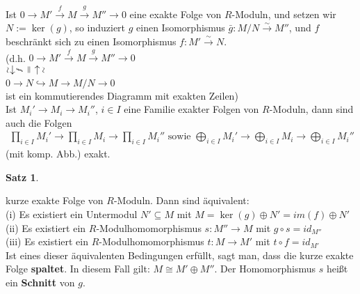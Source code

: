 \documentclass[10pt,a4paper,numbers=endperiod]{scrreprt}
\theoremstyle{definition}
\newtheorem{satz}{Satz}[section]
\newcommand{\verteq}{\rotatebox{90}{$\,=$}}
\newcommand{\vertri}{\rotatebox{90}{$\underset{f}{\overset{\sim}{\leftarrow}}$}}
\newcommand{\vertle}{\rotatebox{90}{$\underset{\sim}{\rightarrow}$}}
\begin{document}
Ist $0 \longrightarrow M' \overset{f}{\longrightarrow} M \overset{g}{\longrightarrow} M'' \longrightarrow 0$ eine exakte Folge von $R$-Moduln, und setzen wir $N := \ker(g)$, so induziert $g$ einen Isomorphismus $\bar{g}: M/N \overset{\sim}{\longrightarrow} M''$, und $f$ beschränkt sich zu einen Isomorphismus $f: M' \overset{\sim}{\longrightarrow} N$.\\
(d.h.  $0 \longrightarrow M' \overset{f}{\longrightarrow} M \overset{g}{\longrightarrow} M'' \longrightarrow 0$\\
\hspace*{15mm}$\vertri$ \hspace*{3.5mm} $\verteq$ \hspace*{8.3mm} $\vertle$\\
\hspace*{6.5mm} $0 \longrightarrow N \hookrightarrow M \longrightarrow M/N \longrightarrow 0$\\
ist ein kommutierendes Diagramm mit exakten Zeilen)\\

Ist $M_i' \longrightarrow M_i \longrightarrow M_i''$, $i \in I$ eine Familie exakter Folgen von $R$-Moduln, dann sind auch die Folgen
\begin{align*}
	\prod\limits_{i \in I} M_i' \longrightarrow \prod\limits_{i \in I} M_i \longrightarrow \prod\limits_{i \in I} M_i'' \text{  sowie  } \bigoplus\limits_{i \in I} M_i' \longrightarrow \bigoplus\limits_{i \in I} M_i \longrightarrow \bigoplus\limits_{i \in I} M_i'' 
\end{align*}
(mit komp. Abb.) exakt.
\newpage
\begin{satz}
	$ $\\
	
	kurze exakte Folge von $R$-Moduln. 
	Dann sind äquivalent:\\
	(i) Es existiert ein Untermodul $N' \subseteq M$ mit $M = \ker(g) \oplus N' = im(f) \oplus N'$\\
	(ii) Es existiert ein $R$-Modulhomomorphismus $s: M'' \rightarrow M$ mit $g \circ s = id_{M''}$\\
	(iii) Es existiert ein $R$-Modulhomomorphismus $t: M \rightarrow M'$ mit $t \circ f = id_{M'}$\\
	Ist eines dieser äquivalenten Bedingungen erfüllt, sagt man, dass die kurze exakte Folge \textbf{spaltet}. In diesem Fall gilt: $M \cong M' \oplus M''$. Der Homomorphismus $s$ heißt ein \textbf{Schnitt} von $g$. 
\end{satz}
\end{document}
